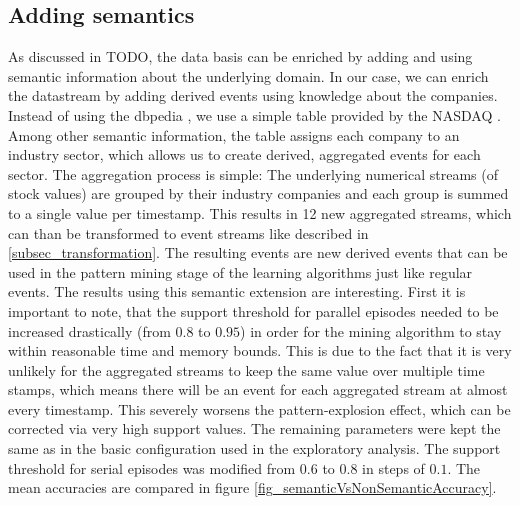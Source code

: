 \subsection{Adding semantics}
As discussed in TODO, the data basis can be enriched by adding and using semantic information about the underlying domain. In our case, we can enrich the datastream by adding derived events using knowledge about the companies. Instead of using the dbpedia \cite{auer2007dbpedia}, we use a simple table provided by the NASDAQ \cite{nasdaqCompanyList}. Among other semantic information, the table assigns each company to an industry sector, which allows us to create derived, aggregated events for each sector. The aggregation process is simple: The underlying numerical streams (of stock values) are grouped by their industry companies and each group is summed to a single value per timestamp. This results in 12 new aggregated streams, which can than be transformed to event streams like described in \ref{subsec_transformation}. The resulting events are new derived events that can be used in the pattern mining stage of the learning algorithms just like regular events. The results using this semantic extension are interesting. First it is important to note, that the support threshold for parallel episodes needed to be increased drastically (from $0.8$ to $0.95$) in order for the mining algorithm to stay within reasonable time and memory bounds. This is due to the fact that it is very unlikely for the aggregated streams to keep the same value over multiple time stamps, which means there will be an event for each aggregated stream at almost every timestamp. This severely worsens the pattern-explosion effect, which can be corrected via very high support values. The remaining parameters were kept the same as in the basic configuration used in the exploratory analysis. The support threshold for serial episodes was modified from $0.6$ to $0.8$ in steps of $0.1$. The mean accuracies are compared in figure \ref{fig_semanticVsNonSemanticAccuracy}. 

